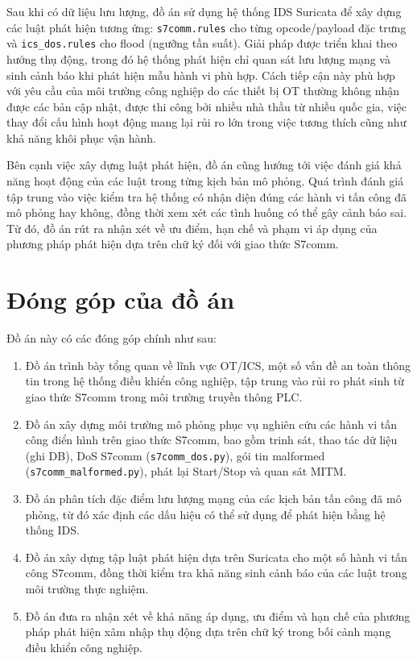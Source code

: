 \documentclass[../main.tex]{subfiles}
\begin{document}
Sau khi có dữ liệu lưu lượng, đồ án sử dụng hệ thống IDS Suricata để xây dựng các luật phát hiện tương ứng: \texttt{s7comm.rules} cho từng opcode/payload đặc trưng và \texttt{ics\_dos.rules} cho flood (ngưỡng tần suất). Giải pháp được triển khai theo hướng thụ động, trong đó hệ thống phát hiện chỉ quan sát lưu lượng mạng và sinh cảnh báo khi phát hiện mẫu hành vi phù hợp. Cách tiếp cận này phù hợp với yêu cầu của môi trường công nghiệp do các thiết bị OT thường không nhận được các bản cập nhật, được thi công bởi nhiều nhà thầu từ nhiều quốc gia, việc thay đổi cấu hình hoạt động mang lại rủi ro lớn trong việc tương thích cũng như khả năng khôi phục vận hành.

Bên cạnh việc xây dựng luật phát hiện, đồ án cũng hướng tới việc đánh giá khả năng hoạt động của các luật trong từng kịch bản mô phỏng. Quá trình đánh giá tập trung vào việc kiểm tra hệ thống có nhận diện đúng các hành vi tấn công đã mô phỏng hay không, đồng thời xem xét các tình huống có thể gây cảnh báo sai. Từ đó, đồ án rút ra nhận xét về ưu điểm, hạn chế và phạm vi áp dụng của phương pháp phát hiện dựa trên chữ ký đối với giao thức S7comm.

\section{Đóng góp của đồ án}

Đồ án này có các đóng góp chính như sau:

\begin{enumerate}
    \item Đồ án trình bày tổng quan về lĩnh vực OT/ICS, một số vấn đề an toàn thông tin trong hệ thống điều khiển công nghiệp, tập trung vào rủi ro phát sinh từ giao thức S7comm trong môi trường truyền thông PLC.

    \item Đồ án xây dựng môi trường mô phỏng phục vụ nghiên cứu các hành vi tấn công điển hình trên giao thức S7comm, bao gồm trinh sát, thao tác dữ liệu (ghi DB), DoS S7comm (\texttt{s7comm\_dos.py}), gói tin malformed (\texttt{s7comm\_malformed.py}), phát lại Start/Stop và quan sát MITM.

    \item Đồ án phân tích đặc điểm lưu lượng mạng của các kịch bản tấn công đã mô phỏng, từ đó xác định các dấu hiệu có thể sử dụng để phát hiện bằng hệ thống IDS.

    \item Đồ án xây dựng tập luật phát hiện dựa trên Suricata cho một số hành vi tấn công S7comm, đồng thời kiểm tra khả năng sinh cảnh báo của các luật trong môi trường thực nghiệm.

    \item Đồ án đưa ra nhận xét về khả năng áp dụng, ưu điểm và hạn chế của phương pháp phát hiện xâm nhập thụ động dựa trên chữ ký trong bối cảnh mạng điều khiển công nghiệp.
\end{enumerate}
\end{document}
